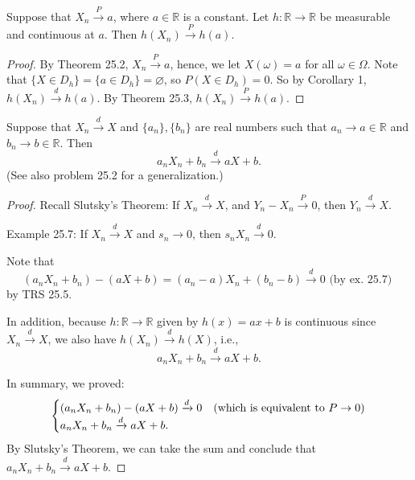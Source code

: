 \begin{corollary}
Suppose that \( X_n \xrightarrow{P} a \), where \( a \in \mathbb{R} \) is a constant. Let \( h: \mathbb{R} \rightarrow \mathbb{R} \) be measurable and continuous at \( a \). Then \( h(X_n) \xrightarrow{P} h(a) \).

\begin{proof}
By Theorem 25.2, \( X_n \xrightarrow{P} a \), hence, we let \( X(\omega) = a \) for all \( \omega \in \Omega \). Note that \( \{ X \in D_h \} = \{ a \in D_h \} = \varnothing \), so \( P(X \in D_h) = 0 \). So by Corollary 1, \( h(X_n) \xrightarrow{d} h(a) \). By Theorem 25.3, \( h(X_n) \xrightarrow{P} h(a) \).
\end{proof}
\end{corollary}

\begin{example}[25.8]
Suppose that \(X_n \xrightarrow{d} X\) and \( \{a_n\}, \{b_n\} \) are real numbers such that \( a_n \rightarrow a \in \mathbb{R} \) and \( b_n \rightarrow b \in \mathbb{R} \). Then
\[ a_n X_n + b_n \xrightarrow{d} aX + b. \]
(See also problem 25.2 for a generalization.)
\end{example}

\begin{proof}
Recall Slutsky's Theorem: If \( X_n \xrightarrow{d} X \), and \( Y_n - X_n \xrightarrow{P} 0 \), then \( Y_n \xrightarrow{d} X \).

Example 25.7: If \( X_n \xrightarrow{d} X \) and \( s_n \rightarrow 0 \), then \( s_n X_n \xrightarrow{d} 0 \).

Note that
\[ (a_n X_n + b_n) - (aX + b) = (a_n - a) X_n + (b_n - b) \xrightarrow{d} 0 \text{ (by ex. 25.7) } \]
by TRS 25.5.

In addition, because \( h: \mathbb{R} \rightarrow \mathbb{R} \) given by \( h(x) = ax + b \) is continuous since \( X_n \xrightarrow{d} X \), we also have \( h(X_n) \xrightarrow{d} h(X) \), i.e.,
\[ a_n X_n + b_n \xrightarrow{d} aX + b. \]

In summary, we proved:
\[
\begin{cases}
(a_n X_n + b_n) - (aX + b) \xrightarrow{d} 0 & \text{(which is equivalent to \( P \rightarrow 0 \))} \\
a_n X_n + b_n \xrightarrow{d} aX + b.
\end{cases}
\]
By Slutsky's Theorem, we can take the sum and conclude that \( a_n X_n + b_n \xrightarrow{d} aX + b \).
\end{proof}



